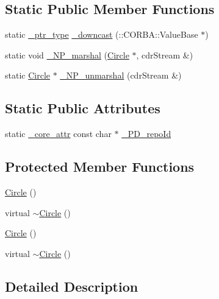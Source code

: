 \subsection*{Static Public Member Functions}
\begin{DoxyCompactItemize}
\item 
static \hyperlink{class_draw_a5164256572b3c4123ceecd1897c248dd}{\+\_\+ptr\+\_\+type} \hyperlink{class_circle_a264dbd97a8e3819388a008d722aab612}{\+\_\+downcast} (\+::C\+O\+R\+B\+A\+::\+Value\+Base $\ast$)
\item 
static void \hyperlink{class_circle_a6b682a01a8bf70dad668ec3f1fc1c5ef}{\+\_\+\+N\+P\+\_\+marshal} (\hyperlink{class_circle}{Circle} $\ast$, cdr\+Stream \&)
\item 
static \hyperlink{class_circle}{Circle} $\ast$ \hyperlink{class_circle_ae8e42637a424b531bcba7cb48fc398ef}{\+\_\+\+N\+P\+\_\+unmarshal} (cdr\+Stream \&)
\end{DoxyCompactItemize}
\subsection*{Static Public Attributes}
\begin{DoxyCompactItemize}
\item 
static \hyperlink{_petit_prince_8hpp_a5f7bf7cddb608c2aad7c95f55f8a33c5}{\+\_\+core\+\_\+attr} const char $\ast$ \hyperlink{class_circle_a3cc85c810268073e3c3f0519aa3b12a0}{\+\_\+\+P\+D\+\_\+repo\+Id}
\end{DoxyCompactItemize}
\subsection*{Protected Member Functions}
\begin{DoxyCompactItemize}
\item 
\hyperlink{class_circle_ad1ecfcfc7bf34529c6a6d6c448bf70fe}{Circle} ()
\item 
virtual \hyperlink{class_circle_ad02555ca63f3574193b958c49f81d178}{$\sim$\+Circle} ()
\item 
\hyperlink{class_circle_ad1ecfcfc7bf34529c6a6d6c448bf70fe}{Circle} ()
\item 
virtual \hyperlink{class_circle_ad02555ca63f3574193b958c49f81d178}{$\sim$\+Circle} ()
\end{DoxyCompactItemize}


\subsection{Detailed Description}


